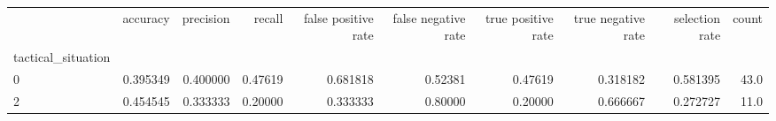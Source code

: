 \begin{tabular}{lrrrrrrrrr}
\toprule
{} &  accuracy &  precision &   recall &  false positive rate &  false negative rate &  true positive rate &  true negative rate &  selection rate &  count \\
tactical\_situation &           &            &          &                      &                      &                     &                     &                 &        \\
\midrule
0                  &  0.395349 &   0.400000 &  0.47619 &             0.681818 &              0.52381 &             0.47619 &            0.318182 &        0.581395 &   43.0 \\
2                  &  0.454545 &   0.333333 &  0.20000 &             0.333333 &              0.80000 &             0.20000 &            0.666667 &        0.272727 &   11.0 \\
\bottomrule
\end{tabular}
